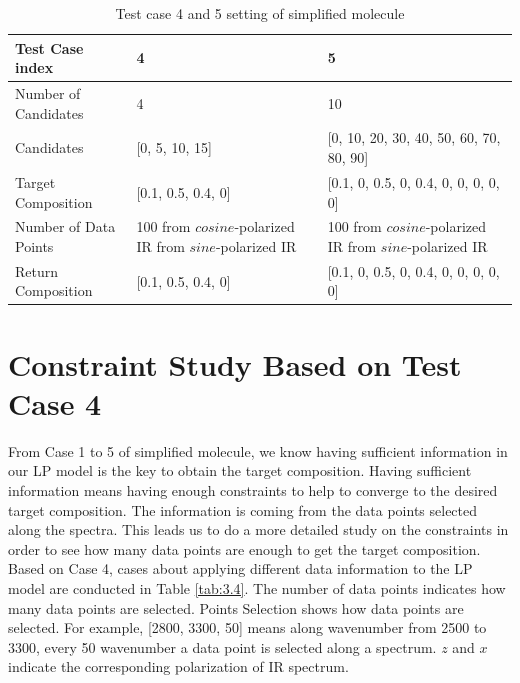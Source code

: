\begin{table} \small 
\begin{center}
\begin{tabular}{| l | p{5cm} | p{6cm} |}
\hline
Test Case index & 4 & 5\\
\hline
Number of Candidates & 4 & 10 \\
\hline
Candidates & [0, 5, 10, 15] & [0, 10, 20, 30, 40, 50, 60, 70, 80, 90] \\
\hline
Target Composition & [0.1, 0.5, 0.4, 0] & [0.1, 0, 0.5, 0, 0.4, 0, 0, 0, 0, 0]\\
\hline
Number of Data Points & 100 from $cosine$-polarized IR \newline 100 from $sine$-polarized IR & 100 from $cosine$-polarized IR \newline 100 from $sine$-polarized IR\\
\hline
Return Composition & [0.1, 0.5, 0.4, 0] & [0.1, 0, 0.5, 0, 0.4, 0, 0, 0, 0, 0] \\
\hline
\end{tabular} 
\caption{Test case 4 and 5 setting of simplified molecule}\label{tab:3.3}
\end{center}
\end{table}		

\section{Constraint Study Based on Test Case 4}

From Case 1 to 5 of simplified molecule, we know having sufficient information in our LP model is the key to obtain the target composition. Having sufficient information means having enough constraints to help to converge to the desired target composition. The information is coming from the data points selected along the spectra. This leads us to do a more detailed study on the constraints in order to see how many data points are enough to get the target composition.\\ 

Based on Case 4, cases about applying different data information to the LP model are conducted in Table \ref{tab:3.4}. The number of data points indicates how many data points are selected. Points Selection shows how data points are selected. For example, [2800, 3300, 50] means along wavenumber from 2500 to 3300, every 50 wavenumber a data point is selected along a spectrum. $z$ and $x$ indicate the corresponding polarization of IR spectrum. \\

